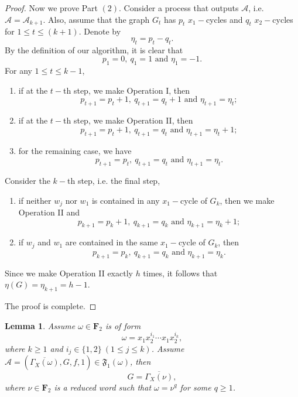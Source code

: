 \documentclass{amsart}
\theoremstyle{plain}
\newtheorem{lemma}[theorem]{Lemma}
\theoremstyle{definition}
\theoremstyle{remark}
\begin{document}
\begin{proof}
     Now we prove Part $(2)$.  Consider a process that outputs $\mathcal{A}$, i.e. $\mathcal{A}=\mathcal{A}_{k+1}$. Also, assume that the graph $G_{t}$ has $p_t$ $x_1-$cycles and $q_t$ $x_2-$cycles for $1\leq t \leq (k+1)$. Denote by $$\eta_t=p_t-q_t.$$ By the definition of our algorithm, it is clear that
    $$p_1=0,\ q_1=1\text{ and }\eta_1=-1.$$
    For any $1\leq t\leq k-1$,   
    \begin{enumerate}
    \item if at the $t-$th step, we make Operation I, then 
    $$p_{t+1}=p_t+1,\ q_{t+1}=q_t+1\text{ and }\eta_{t+1}=\eta_t;$$
    \item if at the $t-$th step, we make Operation II, then 
    $$p_{t+1}=p_t+1,\ q_{t+1}=q_t\text{ and }\eta_{t+1}=\eta_t+1;$$
    \item for the remaining case, we have
    $$ p_{t+1}=p_t,\ q_{t+1}=q_t\text{ and }\eta_{t+1}=\eta_t.$$
\end{enumerate}
Consider the $k-$th step, i.e. the final step, 
\begin{enumerate}
\item[(a)] if neither $w_j$ nor $w_1$ is contained in any $x_1-$cycle of $G_k$, then we make Operation II and
$$ p_{k+1}=p_k+1,\ q_{k+1}=q_k\text{ and }\eta_{k+1}=\eta_k+1;$$
\item[(b)] if $w_j$ and $w_1$ are contained in the same $x_1-$cycle of $G_k$, then  
$$p_{k+1}=p_k,\ q_{k+1}=q_k\text{ and }\eta_{k+1}=\eta_k.$$
\end{enumerate}
Since we make Operation II exactly $h$ times, it follows that $\eta(G)=\eta_{k+1}=h-1$.

The proof is complete.
\end{proof}
\begin{lemma}\label{l-zeta}
   Assume $\omega\in\textbf{F}_2$ is of form
$$\omega=x_1x_2^{i_1}\cdots x_1x_2^{i_k},$$
where $k\geq 1$ and $i_j\in\{1,2\}\ (1\leq j\leq k)$. Assume $\mathcal{A}=\left(\overline{\Gamma_X(\omega)},G,f,1\right)\in\mathfrak{F}_1(\omega)$, then $$G=\overline{\Gamma_X(\nu)},$$ where $\nu\in\textbf{F}_2$ is a reduced word such that $\omega=\nu^q$
    for some $q\geq 1$.

\end{lemma}
\end{document}

